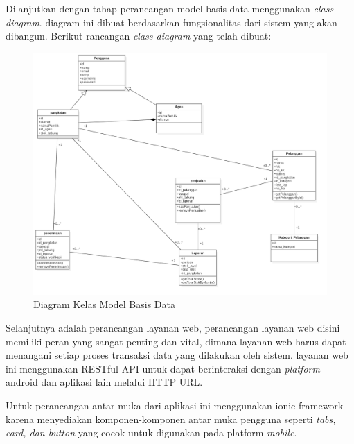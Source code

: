 	\pagebreak
	\par Dilanjutkan dengan tahap perancangan model basis data menggunakan \textit{class diagram}. diagram ini dibuat berdasarkan fungsionalitas dari sistem yang akan dibangun. Berikut rancangan \textit{class diagram} yang telah dibuat:
	
		\vspace{-0.4cm}
	\begin{figure}[H]
		\center
		\includegraphics [width = 14cm]{gambar/model/class-diagram}
		\caption{Diagram Kelas Model Basis Data }
		\label{class}
	\end{figure}

	\par Selanjutnya adalah perancangan layanan web, perancangan layanan web disini memiliki peran yang sangat penting dan vital, dimana layanan web harus dapat menangani setiap proses transaksi data yang dilakukan oleh sistem. layanan web ini menggunakan RESTful API untuk dapat berinteraksi dengan \textit{platform} android dan aplikasi lain melalui HTTP URL.
	
	\par Untuk perancangan antar muka dari aplikasi ini menggunakan ionic framework karena menyediakan komponen-komponen antar muka pengguna seperti \textit{tabs, card, dan button} yang cocok untuk digunakan pada platform \textit{mobile}.
	
